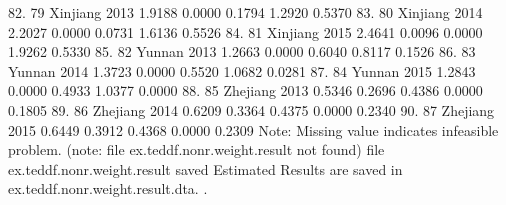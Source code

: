  82. {\VBAR}  79       Xinjiang   2013   1.9188   0.0000   0.1794   1.2920   0.5370 {\VBAR}
 83. {\VBAR}  80       Xinjiang   2014   2.2027   0.0000   0.0731   1.6136   0.5526 {\VBAR}
 84. {\VBAR}  81       Xinjiang   2015   2.4641   0.0096   0.0000   1.9262   0.5330 {\VBAR}
 85. {\VBAR}  82         Yunnan   2013   1.2663   0.0000   0.6040   0.8117   0.1526 {\VBAR}
 86. {\VBAR}  83         Yunnan   2014   1.3723   0.0000   0.5520   1.0682   0.0281 {\VBAR}
 87. {\VBAR}  84         Yunnan   2015   1.2843   0.0000   0.4933   1.0377   0.0000 {\VBAR}
 88. {\VBAR}  85       Zhejiang   2013   0.5346   0.2696   0.4386   0.0000   0.1805 {\VBAR}
 89. {\VBAR}  86       Zhejiang   2014   0.6209   0.3364   0.4375   0.0000   0.2340 {\VBAR}
 90. {\VBAR}  87       Zhejiang   2015   0.6449   0.3912   0.4368   0.0000   0.2309 {\VBAR}
     {\BLC}
Note: Missing value indicates infeasible problem.
(note: file ex.teddf.nonr.weight.result not found)
file ex.teddf.nonr.weight.result saved
{\smallskip}
Estimated Results are saved in ex.teddf.nonr.weight.result.dta.
{\smallskip}
. 
